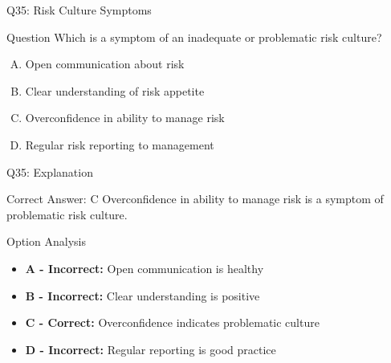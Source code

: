 \documentclass{beamer}
\begin{document}
	\begin{frame}{Q35: Risk Culture Symptoms}
		\begin{block}{Question}
			Which is a symptom of an inadequate or problematic risk culture?
		\end{block}
		\begin{enumerate}[(A)]
			\item Open communication about risk
			\item Clear understanding of risk appetite
			\item Overconfidence in ability to manage risk
			\item Regular risk reporting to management
		\end{enumerate}
	\end{frame}
	
	\begin{frame}{Q35: Explanation}
		\begin{block}{Correct Answer: C}
			Overconfidence in ability to manage risk is a symptom of problematic risk culture.
		\end{block}
		\begin{block}{Option Analysis}
			\begin{itemize}
				\item \textbf{A - Incorrect:} Open communication is healthy
				\item \textbf{B - Incorrect:} Clear understanding is positive
				\item \textbf{C - Correct:} Overconfidence indicates problematic culture
				\item \textbf{D - Incorrect:} Regular reporting is good practice
			\end{itemize}
		\end{block}
	\end{frame}
	
\end{document}
